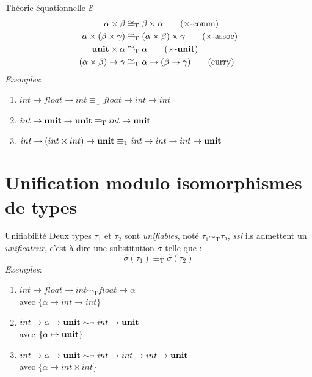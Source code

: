 \documentclass[serif]{beamer}
\newcommand{\exemples}{\textit{Exemples}\xspace}
\newcommand{\ssi}{\textit{ssi}\xspace}
\newcommand{\unit}{\bold{unit}}
\newcommand{\E}{\mathscr{E}}
\newcommand{\T}{\mathrm{T}}
\begin{document}
\begin{frame}{Théorie équationnelle $\E$}
\small
\begin{align}
		\alpha \times \beta &\cong_\T
		\beta \times \alpha
		\label{prod_comm}
		\tag{$\times$-comm}
	\\
		\alpha \times (\beta \times \gamma) &\cong_\T
		(\alpha \times \beta) \times \gamma
		\label{prod_assoc}
		\tag{$\times$-assoc}
	\\
		\unit \times \alpha &\cong_\T
		\alpha
		\label{prod_unit}
		\tag{$\times$-$\unit$}
	\\
		(\alpha \times \beta) \rightarrow \gamma &\cong_\T
		\alpha \rightarrow (\beta \rightarrow \gamma)
		\label{curry}
		\tag{curry}
\end{align}
\exemples :
\begin{enumerate}
	\item $int \rightarrow float \rightarrow int \equiv_\T float \rightarrow int \rightarrow int$
	\item $int \rightarrow \unit \rightarrow \unit \equiv_\T int \rightarrow \unit$
	\item $int \rightarrow (int \times int) \rightarrow \unit \equiv_\T int \rightarrow int \rightarrow int \rightarrow \unit$
\end{enumerate}
\end{frame}


\section{Unification modulo isomorphismes de types}


\begin{frame}{Unifiabilité}
\small
Deux types $\tau_1$ et $\tau_2$ sont \emph{unifiables}, noté $\tau_1 \sim_\T \tau_2$, \ssi ils admettent un \emph{unificateur}, c'est-à-dire une substitution $\sigma$ telle que :
\[ \hat\sigma (\tau_1) \equiv_\T \hat\sigma (\tau_2) \]
\exemples :
\begin{enumerate}
	\item $int \rightarrow float \rightarrow int \sim_\T float \rightarrow \alpha$ \\ avec $\{ \alpha \mapsto int \rightarrow int \}$
	\item $int \rightarrow \alpha \rightarrow \unit \sim_\T int \rightarrow \unit$ \\ avec $\{ \alpha \mapsto \unit \}$
	\item $int \rightarrow \alpha \rightarrow \unit \sim_\T int \rightarrow int \rightarrow int \rightarrow \unit$ \\ avec $\{ \alpha \mapsto int \times int \}$
\end{enumerate}
\end{frame}
\end{document}
